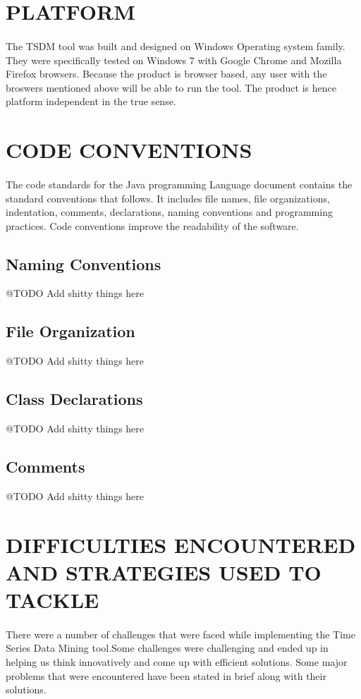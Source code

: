 \documentclass[12pt]{report}
\begin{document}
\section{PLATFORM}
\paragraph{}The TSDM tool was built and designed on Windows Operating system family. They were specifically tested on Windows 7 with Google Chrome and Mozilla Firefox browsers. Because the product is browser based, any user with the broswers mentioned above will be able to run the tool. The product is hence platform independent in the true sense.
\section{CODE CONVENTIONS}
\paragraph{}The code standards for the Java programming Language document contains the standard conventions that follows. It includes file names, file organizations, indentation, comments, declarations, naming conventions and programming practices. Code conventions improve the readability of the software.
\subsection{Naming Conventions}
@TODO Add shitty things here
\subsection{File Organization}
@TODO Add shitty things here
\subsection{Class Declarations}
@TODO Add shitty things here
\subsection{Comments}
@TODO Add shitty things here
\section{DIFFICULTIES ENCOUNTERED AND STRATEGIES USED TO TACKLE}

\paragraph{}There were a number of challenges that were faced while implementing the Time Series Data Mining tool.Some challenges were challenging and ended up in helping us think innovatively and come up with efficient solutions. Some major problems that were encountered have been stated in brief along with their solutions.
\end{document}
